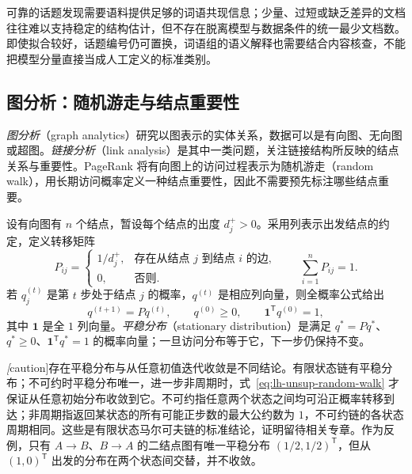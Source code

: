 可靠的话题发现需要语料提供足够的词语共现信息；少量、过短或缺乏差异的文档往往难以支持稳定的结构估计，但不存在脱离模型与数据条件的统一最少文档数。即使拟合较好，话题编号仍可置换，词语组的语义解释也需要结合内容核查，不能把模型分量直接当成人工定义的标准类别。

\subsection{图分析：随机游走与结点重要性}
\label{subsec:lh-unsup-graph-analysis}

\emph{图分析}（graph analytics）研究以图表示的实体关系，数据可以是有向图、无向图或超图。\emph{链接分析}（link analysis）是其中一类问题，关注链接结构所反映的结点关系与重要性。PageRank 将有向图上的访问过程表示为随机游走（random walk），用长期访问概率定义一种结点重要性，因此不需要预先标注哪些结点重要。

设有向图有 $n$ 个结点，暂设每个结点的出度 $d_j^+>0$。采用列表示出发结点的约定，定义转移矩阵
\begin{equation}
P_{ij}=\begin{cases}
1/d_j^+,&\text{存在从结点 $j$ 到结点 $i$ 的边},\\
0,&\text{否则}.
\end{cases}
\qquad \sum_{i=1}^nP_{ij}=1.
\label{eq:lh-unsup-graph-transition}
\end{equation}
若 $q_j^{(t)}$ 是第 $t$ 步处于结点 $j$ 的概率，$q^{(t)}$ 是相应列向量，则全概率公式给出
\begin{equation}
q^{(t+1)}=Pq^{(t)},\qquad
q^{(0)}\geq0,\qquad \mathbf1^{\mathsf T}q^{(0)}=1,
\label{eq:lh-unsup-random-walk}
\end{equation}
其中 $\mathbf1$ 是全 $1$ 列向量。\emph{平稳分布}（stationary distribution）是满足 $q^*=Pq^*$、$q^*\geq0$、$\mathbf1^{\mathsf T}q^*=1$ 的概率向量；一旦访问分布等于它，下一步仍保持不变。

\emph[caution]{存在平稳分布与从任意初值迭代收敛是不同结论。}有限状态链有平稳分布；不可约时平稳分布唯一，进一步非周期时，式~\eqref{eq:lh-unsup-random-walk} 才保证从任意初始分布收敛到它。不可约指任意两个状态之间均可沿正概率转移到达；非周期指返回某状态的所有可能正步数的最大公约数为 $1$，不可约链的各状态周期相同。这些是有限状态马尔可夫链的标准结论，证明留待相关专章。作为反例，只有 $A\to B$、$B\to A$ 的二结点图有唯一平稳分布 $(1/2,1/2)^{\mathsf T}$，但从 $(1,0)^{\mathsf T}$ 出发的分布在两个状态间交替，并不收敛。

